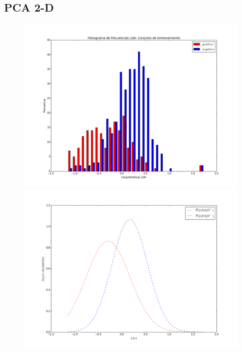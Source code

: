 \documentclass[letter, titlepage, 10pt]{article}
\begin{document}
\subsection{PCA 2-D}
  \begin{figure}[H]
  \centering
    \begin{minipage}{.5\textwidth}
        \centering
        \includegraphics[width=1\linewidth]{images/Histograma_D2}
    \end{minipage}%
    \begin{minipage}{.5\textwidth}
        \centering
        \includegraphics[width=1\linewidth]{images/PDF_D2}

\end{minipage}
\end{figure}
\end{document}
